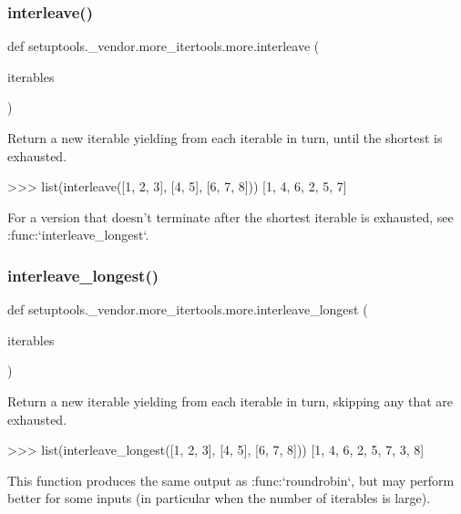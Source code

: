 \subsubsection{\texorpdfstring{interleave()}{interleave()}}
{\footnotesize\ttfamily def setuptools.\+\_\+vendor.\+more\+\_\+itertools.\+more.\+interleave (\begin{DoxyParamCaption}\item[{}]{iterables }\end{DoxyParamCaption})}

\begin{DoxyVerb}Return a new iterable yielding from each iterable in turn,
until the shortest is exhausted.

    >>> list(interleave([1, 2, 3], [4, 5], [6, 7, 8]))
    [1, 4, 6, 2, 5, 7]

For a version that doesn't terminate after the shortest iterable is
exhausted, see :func:`interleave_longest`.\end{DoxyVerb}
 \mbox{\label{namespacesetuptools_1_1__vendor_1_1more__itertools_1_1more_a3f0f308dbc9021aa791615be9106fcf8}} 
\subsubsection{\texorpdfstring{interleave\+\_\+longest()}{interleave\_longest()}}
{\footnotesize\ttfamily def setuptools.\+\_\+vendor.\+more\+\_\+itertools.\+more.\+interleave\+\_\+longest (\begin{DoxyParamCaption}\item[{}]{iterables }\end{DoxyParamCaption})}

\begin{DoxyVerb}Return a new iterable yielding from each iterable in turn,
skipping any that are exhausted.

    >>> list(interleave_longest([1, 2, 3], [4, 5], [6, 7, 8]))
    [1, 4, 6, 2, 5, 7, 3, 8]

This function produces the same output as :func:`roundrobin`, but may
perform better for some inputs (in particular when the number of iterables
is large).\end{DoxyVerb}
 \mbox{\label{namespacesetuptools_1_1__vendor_1_1more__itertools_1_1more_a2449b22e6f45c7532810cf3bda514ac5}} 

